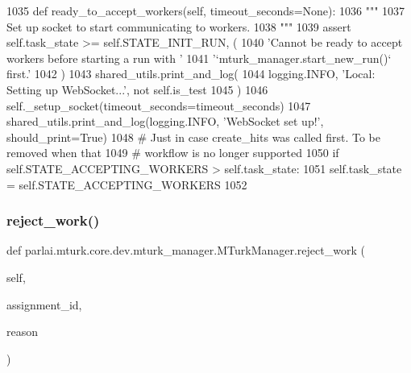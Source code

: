 \begin{DoxyCode}
1035     \textcolor{keyword}{def }ready\_to\_accept\_workers(self, timeout\_seconds=None):
1036         \textcolor{stringliteral}{"""}
1037 \textcolor{stringliteral}{        Set up socket to start communicating to workers.}
1038 \textcolor{stringliteral}{        """}
1039         \textcolor{keyword}{assert} self.task\_state >= self.STATE\_INIT\_RUN, (
1040             \textcolor{stringliteral}{'Cannot be ready to accept workers before starting a run with '}
1041             \textcolor{stringliteral}{'`mturk\_manager.start\_new\_run()` first.'}
1042         )
1043         shared\_utils.print\_and\_log(
1044             logging.INFO, \textcolor{stringliteral}{'Local: Setting up WebSocket...'}, \textcolor{keywordflow}{not} self.is\_test
1045         )
1046         self.\_setup\_socket(timeout\_seconds=timeout\_seconds)
1047         shared\_utils.print\_and\_log(logging.INFO, \textcolor{stringliteral}{'WebSocket set up!'}, should\_print=\textcolor{keyword}{True})
1048         \textcolor{comment}{# Just in case create\_hits was called first. To be removed when that}
1049         \textcolor{comment}{# workflow is no longer supported}
1050         \textcolor{keywordflow}{if} self.STATE\_ACCEPTING\_WORKERS > self.task\_state:
1051             self.task\_state = self.STATE\_ACCEPTING\_WORKERS
1052 
\end{DoxyCode}
\mbox{\label{classparlai_1_1mturk_1_1core_1_1dev_1_1mturk__manager_1_1MTurkManager_ac7196b1435c273c7ad50f5fef98d6d00}} 
\subsubsection{\texorpdfstring{reject\+\_\+work()}{reject\_work()}}
{\footnotesize\ttfamily def parlai.\+mturk.\+core.\+dev.\+mturk\+\_\+manager.\+M\+Turk\+Manager.\+reject\+\_\+work (\begin{DoxyParamCaption}\item[{}]{self,  }\item[{}]{assignment\+\_\+id,  }\item[{}]{reason }\end{DoxyParamCaption})}

